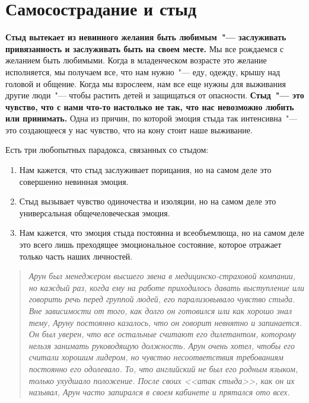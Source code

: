 
\chapter{Самосострадание и стыд} \label{Self-Compassion_and_Shame}

\textbf{Стыд вытекает из невинного желания быть любимым~"--- заслуживать привязанность и заслуживать быть на своем месте.} Мы все рождаемся с желанием быть любимыми. Когда в младенческом возрасте это желание исполняется, мы получаем все, что нам нужно~"--- еду, одежду, крышу над головой и общение. Когда мы взрослеем, нам все еще нужны для выживания другие люди~"--- чтобы растить детей и защищаться от опасности. \textbf{Стыд~"--- это чувство, что с нами что-то настолько не так, что нас невозможно любить или принимать.} Одна из причин, по которой эмоция стыда так интенсивна~"--- это создающееся у нас чувство, что на кону стоит наше выживание.

\vspace{2ex}

Есть три любопытных парадокса, связанных со стыдом:
\begin{enumerate}
	\item Нам кажется, что стыд заслуживает порицания, но на самом деле это совершенно невинная эмоция.	
	\item Стыд вызывает чувство одиночества и изоляции, но на самом деле это универсальная общечеловеческая эмоция.
	\item Нам кажется, что эмоция стыда постоянна и всеобъемлюща, но на самом деле это всего лишь преходящее эмоциональное состояние, которое отражает только часть наших личностей.
\end{enumerate}

\begin{quotation}
	\textit{
		Арун был менеджером высшего звена в медицинско-страховой компании, но каждый раз, когда ему на работе приходилось давать выступление или говорить речь перед группой людей, его парализовывало чувство стыда. Вне зависимости от того, как долго он готовился или как хорошо знал тему, Аруну постоянно казалось, что он говорит невнятно и запинается. Он был уверен, что все остальные считают его дилетантом, которому нельзя занимать руководящую должность. Арун очень хотел, чтобы его считали хорошим лидером, но чувство несоответствия требованиям постоянно его одолевало. То, что английский не был его родным языком, только ухудшало положение. После своих <<атак стыда>>, как он их называл, Арун часто запирался в своем кабинете и прятался ото всех.
	}
\end{quotation}

